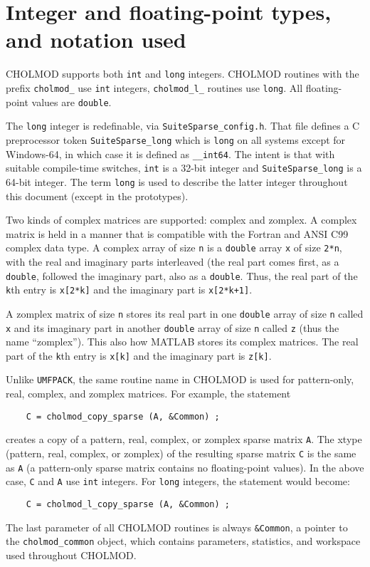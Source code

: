 \documentclass[11pt]{article}
\begin{document}
\newpage \section{Integer and floating-point types, and notation used}

CHOLMOD supports both {\tt int} and {\tt long} integers.  CHOLMOD
routines with the prefix {\tt cholmod\_} use {\tt int} integers,
{\tt cholmod\_l\_} routines use {\tt long}.  All floating-point
values are {\tt double}.

The {\tt long} integer is redefinable, via {\tt SuiteSparse\_config.h}.
That file defines a C preprocessor token {\tt SuiteSparse\_long} which is
{\tt long} on all systems except for Windows-64, in which case it is
defined as {\tt \_\_int64}.  The intent is that with suitable compile-time
switches, {\tt int} is a 32-bit integer and {\tt SuiteSparse\_long} is a 64-bit
integer.  The term {\tt long} is used to describe the latter
integer throughout this document (except in the prototypes).

Two kinds of complex matrices are supported: complex and zomplex.
A complex matrix is held in a manner that is compatible with the
Fortran and ANSI C99 complex data type.  A complex array of size {\tt n}
is a {\tt double} array {\tt x} of size {\tt 2*n}, with the real and imaginary
parts interleaved (the real part comes first, as a {\tt double}, followed the
imaginary part, also as a {\tt double}.  Thus, the real part of the {\tt k}th
entry is {\tt x[2*k]} and the imaginary part is {\tt x[2*k+1]}.

A zomplex matrix of size {\tt n} stores its real part in one
{\tt double} array of size {\tt n} called {\tt x} and its imaginary part
in another {\tt double} array of size {\tt n} called {\tt z} (thus the
name ``zomplex'').  This also how MATLAB stores its complex matrices.
The real part of the {\tt k}th entry is {\tt x[k]} and the imaginary part is
{\tt z[k]}.

Unlike {\tt UMFPACK}, the same routine name in CHOLMOD is used for pattern-only,
real, complex, and zomplex matrices.  For example, the statement
\begin{verbatim}
    C = cholmod_copy_sparse (A, &Common) ;
\end{verbatim}
creates a copy of a pattern, real, complex, or zomplex sparse matrix {\tt A}.
The xtype (pattern, real, complex, or zomplex) of the resulting sparse matrix {\tt C}
is the same as {\tt A} (a pattern-only sparse matrix contains no floating-point
values).  In the above case, {\tt C} and {\tt A} use {\tt int} integers.
For {\tt long} integers, the statement would become:
\begin{verbatim}
    C = cholmod_l_copy_sparse (A, &Common) ;
\end{verbatim}
The last parameter of all CHOLMOD routines is always {\tt \&Common},
a pointer to the
{\tt cholmod\_common} object, which contains parameters, statistics,
and workspace used throughout CHOLMOD.
\end{document}
